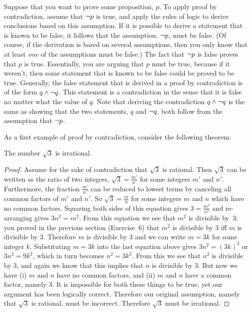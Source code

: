 Suppose that you want to prove some proposition, $p$.
To apply proof by contradiction, assume that $\lnot p$ is true,
and apply the rules of logic to derive conclusions based on this
assumption.  If it is possible to derive a statement that is known
to be false, it follows that the assumption, $\lnot p$, must be false.
(Of course, if the derivation is based on several assumptions, then you only
know that at least \emph{one} of the assumptions must be false.)
The fact that $\lnot p$ is false proves that $p$ is true.
Essentially, you are arguing that $p$ must be true, because if it 
weren't, then some statement that is known to be false could be proved to be true.
Generally, the false statement that is derived in a proof by
contradiction is of the form $q\wedge \lnot q$.  This statement
is a contradiction in the sense that it is false no matter what
the value of $q$.  Note that deriving the contradiction $q\wedge \lnot q$
is the same as showing that the two statements, $q$ and $\lnot q$, both
follow from the assumption that $\lnot p$.

As a first example of proof by contradiction, consider the
following theorem:

\begin{theorem}
The number $\sqrt{3}$ is irrational.
\end{theorem}

\begin{proof}
Assume for the sake of contradiction that $\sqrt{3}$ is rational.
Then $\sqrt{3}$ can be written as the ratio of two integers,
$\sqrt{3} = \frac{m'}{n'}$ for some integers $m'$ and $n'$.
Furthermore, the fraction $\frac{m'}{n'}$ can be reduced to lowest
terms by canceling all common factors of $m'$ and $n'$.  So
$\sqrt{3} = \frac{m}{n}$ for some integers $m$ and $n$ which have no
common factors.  Squaring both sides of this equation gives
$3 = \frac{m^2}{n^2}$ and re-arranging gives $3n^2 = m^2.$  From
this equation we see that $m^2$ is divisible by~3; you proved in
the previous section (Exercise~6) that $m^2$ is divisible by 3 iff $m$ is
divisible by 3.  Therefore $m$ is divisible by 3 and we can write
$m=3k$ for some integer $k$.  Substituting $m=3k$ into the last equation
above gives $3n^2 = (3k)^2$ or $3n^2 = 9k^2$, which in turn becomes
$n^2 = 3k^2.$  From this we see that $n^2$ is divisible by 3, and
again we know that this implies that $n$ is divisible by 3.  But
now we have (i) $m$ and $n$ have no common factors, and (ii) $m$ and
$n$ have a common factor, namely 3.  It is impossible for both these
things to be true, yet our argument has been logically correct.  
Therefore our original assumption, namely that $\sqrt{3}$ is rational,
must be incorrect.  Therefore $\sqrt{3}$ must be irrational.
\end{proof}

